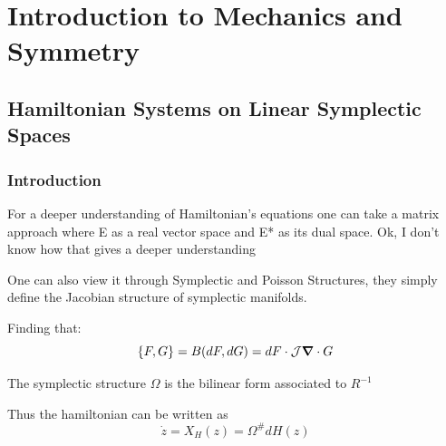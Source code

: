 \chapter{Introduction to Mechanics and Symmetry}

\section{Hamiltonian Systems on Linear Symplectic Spaces}
\subsection{Introduction}
For a deeper understanding of Hamiltonian's equations one can take a matrix approach where E as a real vector space and E* as its dual space. Ok, I don't know how that gives a deeper understanding

One can also view it through Symplectic and Poisson Structures, they simply define the Jacobian structure of symplectic manifolds.

Finding that:
\[
\pb{F}{G} = B(dF, dG) = dF \cdot \mathcal{J}\grad \cdot G
  \]

The symplectic structure $\Omega$ is the bilinear form associated to $R^{-1}$

Thus the hamiltonian can be written as
\[
\dot{z} = X_H(z) = \Omega^{\#}dH(z)
  \]
